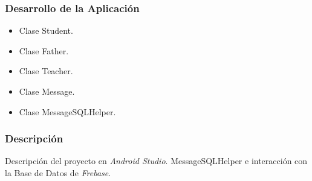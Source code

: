 \begin{frame}
	\frametitle{Desarrollo de la Aplicación}
		\begin{itemize}
			\item Clase {\ttfamily Student}.
			\item Clase {\ttfamily Father}.
			\item Clase {\ttfamily Teacher}.
			\item Clase {\ttfamily Message}.
			\item Clase {\ttfamily MessageSQLHelper}.
		\end{itemize}
	\endblock{}
\end{frame}


\begin{frame}
	\frametitle{Descripción}
	\block{}
		Descripción del proyecto en {\it Android Studio}.
		{\ttfamily MessageSQLHelper} e interacción con la Base de Datos de {\it Frebase}.
	\endblock{}
\end{frame}

